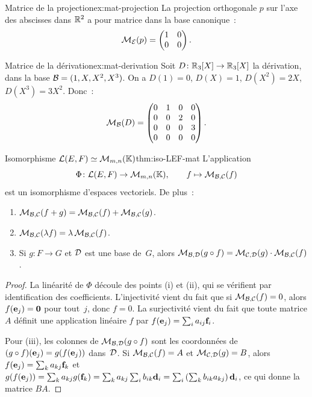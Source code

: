 \begin{example}{Matrice de la projection}{ex:mat-projection}
  La projection orthogonale $p$ sur l'axe des abscisses dans ${\mathbb{R}}^2$ a
  pour matrice dans la base canonique~:
  \[
    \mathcal{M}_{\mathcal{E}}(p)=\begin{pmatrix}1&0\\0&0\end{pmatrix}.
  \]
\end{example}

\begin{example}{Matrice de la dérivation}{ex:mat-derivation}
  Soit $D\colon{\mathbb{R}}_3[X]\to{\mathbb{R}}_3[X]$ la dérivation, dans la base
  ${\mathcal{B}}=(1,X,X^2,X^3)$. On a $D(1)=0$, $D(X)=1$, $D(X^2)=2X$,
  $D(X^3)=3X^2$. Donc~:
  \[
    \mathcal{M}_{\mathcal{B}}(D)=\begin{pmatrix}
      0&1&0&0\\ 0&0&2&0\\ 0&0&0&3\\ 0&0&0&0
    \end{pmatrix}.
  \]
\end{example}

\begin{theorem}{Isomorphisme ${\mathcal{L}}(E,F)\simeq\mathcal{M}_{m,n}({\mathbb{K}})$}{thm:iso-LEF-mat}
  L'application
  \[
    \Phi\colon{\mathcal{L}}(E,F)\to\mathcal{M}_{m,n}({\mathbb{K}}),\qquad f\mapsto\mathcal{M}_{{\mathcal{B}},{\mathcal{C}}}(f)
  \]
  est un isomorphisme d'espaces vectoriels. De plus~:
  \begin{enumerate}[label=(\roman*)]
    \item $\mathcal{M}_{{\mathcal{B}},{\mathcal{C}}}(f+g)=\mathcal{M}_{{\mathcal{B}},{\mathcal{C}}}(f)+\mathcal{M}_{{\mathcal{B}},{\mathcal{C}}}(g)$.
    \item $\mathcal{M}_{{\mathcal{B}},{\mathcal{C}}}(\lambda f)=\lambda\,\mathcal{M}_{{\mathcal{B}},{\mathcal{C}}}(f)$.
    \item Si $g\colon F\to G$ et ${\mathcal{D}}$ est une base de~$G$, alors
      $\mathcal{M}_{{\mathcal{B}},{\mathcal{D}}}(g\circ f)=\mathcal{M}_{{\mathcal{C}},{\mathcal{D}}}(g)\cdot\mathcal{M}_{{\mathcal{B}},{\mathcal{C}}}(f)$.
  \end{enumerate}
\end{theorem}

\begin{proof}
  La linéarité de $\Phi$ découle des points (i) et (ii), qui se
  vérifient par identification des coefficients. L'injectivité vient du
  fait que si $\mathcal{M}_{{\mathcal{B}},{\mathcal{C}}}(f)=0$, alors $f(\mathbf{e}_{j})=\mathbf{0}$ pour
  tout~$j$, donc $f=0$. La surjectivité vient du fait que toute matrice
  $A$ définit une application linéaire $f$ par
  $f(\mathbf{e}_{j})=\sum_i a_{ij}\mathbf{f}_{i}$.

  Pour (iii), les colonnes de $\mathcal{M}_{{\mathcal{B}},{\mathcal{D}}}(g\circ f)$ sont les
  coordonnées de $(g\circ f)(\mathbf{e}_{j})=g(f(\mathbf{e}_{j}))$ dans~${\mathcal{D}}$.
  Si $\mathcal{M}_{{\mathcal{B}},{\mathcal{C}}}(f)=A$ et $\mathcal{M}_{{\mathcal{C}},{\mathcal{D}}}(g)=B$, alors
  $f(\mathbf{e}_{j})=\sum_k a_{kj}\mathbf{f}_{k}$ et
  $g(f(\mathbf{e}_{j}))=\sum_k a_{kj}g(\mathbf{f}_{k})
  =\sum_k a_{kj}\sum_i b_{ik}\mathbf{d}_i
  =\sum_i\left(\sum_k b_{ik}a_{kj}\right)\mathbf{d}_i$,
  ce qui donne la matrice $BA$.
\end{proof}

